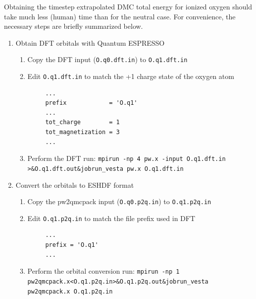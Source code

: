 Obtaining the timestep extrapolated DMC total energy for ionized oxygen should take much less (human) time than for the neutral case.  For convenience, the necessary steps are briefly summarized below.
\begin{enumerate}
  \item{Obtain DFT orbitals with Quantum ESPRESSO}
  \begin{enumerate}
    \item{Copy the DFT input (\texttt{O.q0.dft.in}) to \texttt{O.q1.dft.in}}
    \item{Edit \texttt{O.q1.dft.in} to match the +1 charge state of the oxygen atom}
    \begin{verbatim}
     ...
     prefix            = 'O.q1'
     ...
     tot_charge        = 1
     tot_magnetization = 3
     ...
    \end{verbatim}
    \item{Perform the DFT run: \ifws\verb|mpirun -np 4 pw.x -input O.q1.dft.in >&O.q1.dft.out&|\else\verb|jobrun_vesta pw.x O.q1.dft.in|\fi}
  \end{enumerate}

  \item{Convert the orbitals to ESHDF format}
  \begin{enumerate}
    \item{Copy the pw2qmcpack input (\texttt{O.q0.p2q.in}) to \texttt{O.q1.p2q.in}}
    \item{Edit \texttt{O.q1.p2q.in} to match the file prefix used in DFT}
    \begin{verbatim}
     ...
     prefix = 'O.q1'
     ...
    \end{verbatim}
    \item{Perform the orbital conversion run: \ifws\verb|mpirun -np 1 pw2qmcpack.x<O.q1.p2q.in>&O.q1.p2q.out&|\else\verb|jobrun_vesta pw2qmcpack.x O.q1.p2q.in|\fi}
  \end{enumerate}


\end{enumerate}
